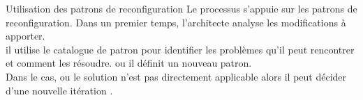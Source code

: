 \begin{frame}{Utilisation des patrons de reconfiguration}
Le processus s'appuie sur les patrons de reconfiguration. Dans un
premier temps, l'architecte analyse les modifications à apporter.\\

il utilise le catalogue de patron pour identifier les problèmes qu'il
peut rencontrer et comment les résoudre. ou il définit un nouveau
patron. \\

Dans le cas, ou le solution n'est pas directement applicable alors il
peut décider d'une nouvelle itération .
\end{frame}
